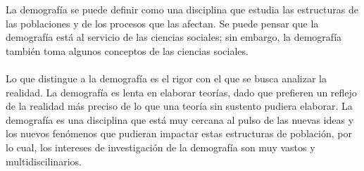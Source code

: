 \documentclass[11pt,spanish,letterpaper]{article}
\theoremstyle{plain}
\begin{document}
La demograf\'ia se puede definir como una disciplina que estudia las estructuras de las poblaciones
y de los procesos que las afectan. Se puede pensar que la demograf\'ia est\'a al servicio de las ciencias sociales; sin embargo, la demograf\'ia tambi\'en toma algunos conceptos de las ciencias sociales.\\
\\
Lo que distingue a la demograf\'ia es el rigor con el que se busca analizar la realidad. La demograf\'ia es lenta en elaborar teor\'ias, dado que prefieren un reflejo de la realidad m\'as preciso de lo que una teor\'ia sin sustento pudiera elaborar. La demograf\'ia es una disciplina que est\'a muy cercana al pulso de las nuevas ideas y los nuevos fen\'omenos que pudieran impactar estas estructuras de poblaci\'on, por lo cual, los intereses de investigaci\'on de la demograf\'ia son muy vastos y multidiscilinarios.
\end{document}
